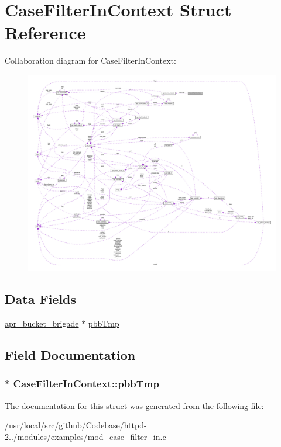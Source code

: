 \hypertarget{structCaseFilterInContext}{}\section{Case\+Filter\+In\+Context Struct Reference}
\label{structCaseFilterInContext}


Collaboration diagram for Case\+Filter\+In\+Context\+:
\nopagebreak
\begin{figure}[H]
\begin{center}
\leavevmode
\includegraphics[width=350pt]{structCaseFilterInContext__coll__graph}
\end{center}
\end{figure}
\subsection*{Data Fields}
\begin{DoxyCompactItemize}
\item 
\hyperlink{structapr__bucket__brigade}{apr\+\_\+bucket\+\_\+brigade} $\ast$ \hyperlink{structCaseFilterInContext_adced43800fb2c8a954bcab021cea76dd}{pbb\+Tmp}
\end{DoxyCompactItemize}


\subsection{Field Documentation}
\subsubsection[{\texorpdfstring{pbb\+Tmp}{pbbTmp}}]{$\ast$ Case\+Filter\+In\+Context\+::pbb\+Tmp}\hypertarget{structCaseFilterInContext_adced43800fb2c8a954bcab021cea76dd}{}\label{structCaseFilterInContext_adced43800fb2c8a954bcab021cea76dd}


The documentation for this struct was generated from the following file\+:\begin{DoxyCompactItemize}
\item 
/usr/local/src/github/\+Codebase/httpd-\/2../modules/examples/\hyperlink{mod__case__filter__in_8c}{mod\+\_\+case\+\_\+filter\+\_\+in.\+c}\end{DoxyCompactItemize}
